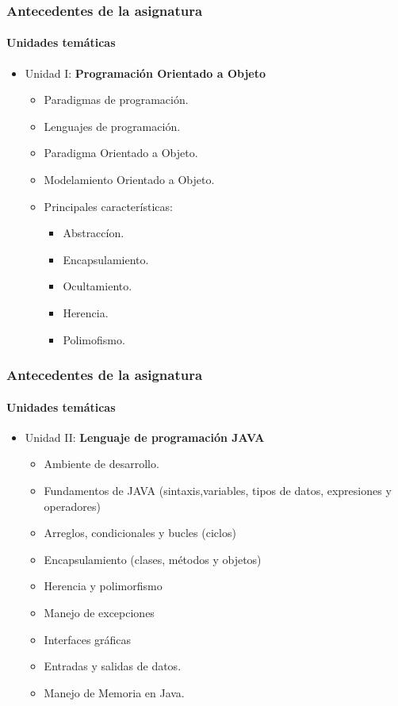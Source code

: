 \documentclass{beamer}
\begin{document}
		\begin{frame}
			\frametitle{Antecedentes de la asignatura}
			\framesubtitle{Unidades tem\'aticas}

			\begin{itemize}
				\item Unidad I: \textbf{Programaci\'on Orientado a Objeto}
				\begin{itemize}
					\item Paradigmas de programaci\'on.
					\item Lenguajes de programaci\'on.
					\item Paradigma Orientado a Objeto.
					\item Modelamiento Orientado a Objeto.
					\item Principales caracter\'isticas:
\begin{itemize}
						\item {Abstracc\'ion}.
						\item {Encapsulamiento}.
						\item {Ocultamiento}.
						\item{ Herencia}.
						\item {Polimofismo}.
\end{itemize}
				\end{itemize}
			\end{itemize}
		\end{frame}

		\begin{frame}
			\frametitle{Antecedentes de la asignatura}
			\framesubtitle{Unidades tem\'aticas}

			\begin{itemize}
				\item Unidad II: \textbf{Lenguaje de programaci\'on JAVA}
				\begin{itemize}
					\item Ambiente  de desarrollo.
					\item Fundamentos de JAVA (sintaxis,variables, tipos de datos, expresiones y operadores)
					\item Arreglos, condicionales y bucles (ciclos)
					\item Encapsulamiento (clases, m\'etodos y objetos)
					\item Herencia y polimorfismo
					\item Manejo de excepciones
					\item Interfaces gr\'aficas 
					\item Entradas y salidas de datos.
					\item Manejo de Memoria en Java.
				\end{itemize}
			\end{itemize}
		\end{frame}
\end{document}
